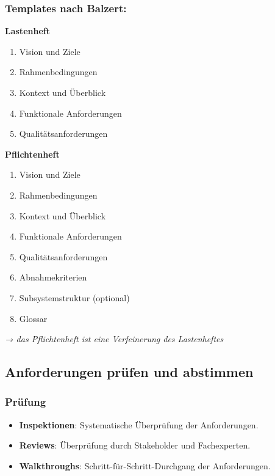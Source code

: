 \documentclass[11pt, a4paper]{article}
\begin{document}
\subsubsection*{Templates nach Balzert:}

\noindent
\begin{minipage}[t]{0.45\textwidth}
    \textbf{Lastenheft}
    \begin{enumerate}
        \item Vision und Ziele
        \item Rahmenbedingungen
        \item Kontext und Überblick
        \item Funktionale Anforderungen
        \item Qualitätsanforderungen
    \end{enumerate}
\end{minipage}
\hfill
\begin{minipage}[t]{0.45\textwidth}
    \textbf{Pflichtenheft}
    \begin{enumerate}
        \item Vision und Ziele
        \item Rahmenbedingungen
        \item Kontext und Überblick
        \item Funktionale Anforderungen
        \item Qualitätsanforderungen
        \item Abnahmekriterien
        \item Subsystemstruktur (optional)
        \item Glossar
    \end{enumerate}
\end{minipage}

\vspace{2em}

\textit{→ das Pflichtenheft ist eine Verfeinerung des Lastenheftes}






\subsection{Anforderungen prüfen und abstimmen}

\subsubsection*{Prüfung}
\begin{itemize}
    \item \textbf{Inspektionen}: Systematische Überprüfung der Anforderungen.
    \item \textbf{Reviews}: Überprüfung durch Stakeholder und Fachexperten.
    \item \textbf{Walkthroughs}: Schritt-für-Schritt-Durchgang der Anforderungen.
\end{itemize}
\end{document}
